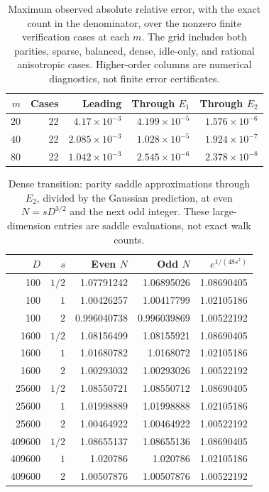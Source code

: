 \begin{table}[tbp]
\centering
\small
\begin{tabular}{rrrrr}
\toprule
$m$ & Cases & Leading & Through $E_1$ & Through $E_2$ \\
\midrule
20 & 22 & $4.17\times10^{-3}$ & $4.199\times10^{-5}$ & $1.576\times10^{-6}$ \\
40 & 22 & $2.085\times10^{-3}$ & $1.028\times10^{-5}$ & $1.924\times10^{-7}$ \\
80 & 22 & $1.042\times10^{-3}$ & $2.545\times10^{-6}$ & $2.378\times10^{-8}$ \\
\bottomrule
\end{tabular}
\caption{Maximum observed absolute relative error, with the exact count in the denominator, over the nonzero finite verification cases at each $m$. The grid includes both parities, sparse, balanced, dense, idle-only, and rational anisotropic cases. Higher-order columns are numerical diagnostics, not finite error certificates.}
\label{tab:verification-errors}
\end{table}

\begin{table}[tbp]
\centering
\small
\begin{tabular}{rrrrr}
\toprule
$D$ & $s$ & Even $N$ & Odd $N$ & $e^{1/(48s^2)}$ \\
\midrule
100 & $1/2$ & 1.07791242 & 1.06895026 & 1.08690405 \\
100 & $1$ & 1.00426257 & 1.00417799 & 1.02105186 \\
100 & $2$ & 0.996040738 & 0.996039869 & 1.00522192 \\
1600 & $1/2$ & 1.08156499 & 1.08155921 & 1.08690405 \\
1600 & $1$ & 1.01680782 & 1.0168072 & 1.02105186 \\
1600 & $2$ & 1.00293032 & 1.00293026 & 1.00522192 \\
25600 & $1/2$ & 1.08550721 & 1.08550712 & 1.08690405 \\
25600 & $1$ & 1.01998889 & 1.01998888 & 1.02105186 \\
25600 & $2$ & 1.00464922 & 1.00464922 & 1.00522192 \\
409600 & $1/2$ & 1.08655137 & 1.08655136 & 1.08690405 \\
409600 & $1$ & 1.020786 & 1.020786 & 1.02105186 \\
409600 & $2$ & 1.00507876 & 1.00507876 & 1.00522192 \\
\bottomrule
\end{tabular}
\caption{Dense transition: parity saddle approximations through $E_2$, divided by the Gaussian prediction, at even $N=sD^{3/2}$ and the next odd integer. These large-dimension entries are saddle evaluations, not exact walk counts.}
\label{tab:verification-dense}
\end{table}

